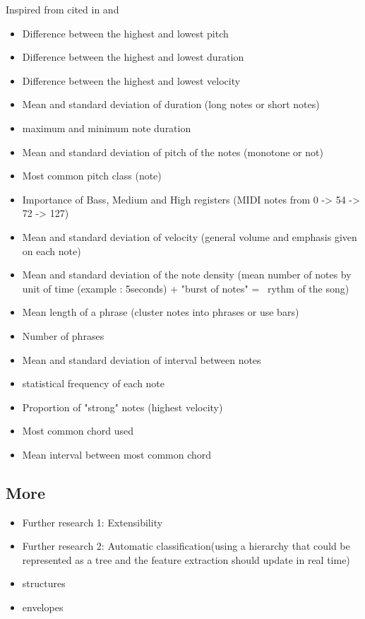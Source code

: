 \documentclass[a4paper,12pt]{article}
\begin{document}
    Inspired from \cite{mckay2004} cited in \cite{mckay2004automatic} and \cite{mckay2004automatic2}
    \begin{itemize}
        \item Difference between the highest and lowest pitch
        \item Difference between the highest and lowest duration
        \item Difference between the highest and lowest velocity
        \item Mean and standard deviation of duration (long notes or short notes)
        \item maximum and minimum note duration
        \item Mean and standard deviation of pitch of the notes (monotone or not)
        \item Most common pitch class (note)
        \item Importance of Bass, Medium and High registers (MIDI notes from 0 -> 54 -> 72 -> 127)
        \item Mean and standard deviation of velocity (general volume and emphasis given on each note)
        \item Mean and standard deviation of the note density (mean number of notes by unit of time (example : 5seconds) + "burst of notes" =~ rythm of the song) 
        \item Mean length of a phrase (cluster notes into phrases or use bars)
        \item Number of phrases
        \item Mean and standard deviation of interval between notes
        \item statistical frequency of each note 
        \item Proportion of "strong" notes (highest velocity)
        \item Most common chord used
        \item Mean interval between most common chord
    \end{itemize}

\subsection{More}

\begin{itemize}
    \item Further research 1: Extensibility
    \item Further research 2: Automatic classification(using a hierarchy that could be represented as a tree and the feature extraction should update in real time)
    \item structures
    \item envelopes
\end{itemize}


\end{document}
